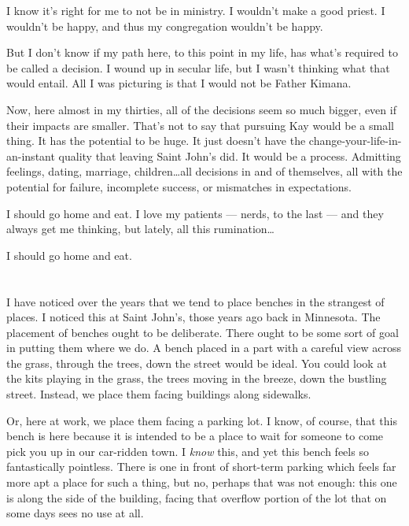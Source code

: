 I know it's right for me to not be in ministry. I wouldn't make a good priest. I wouldn't be happy, and thus my congregation wouldn't be happy.

But I don't know if my path here, to this point in my life, has what's required to be called a decision. I wound up in secular life, but I wasn't thinking what that would entail. All I was picturing is that I would not be Father Kimana.

Now, here almost in my thirties, all of the decisions seem so much bigger, even if their impacts are smaller. That's not to say that pursuing Kay would be a small thing. It has the potential to be huge. It just doesn't have the change-your-life-in-an-instant quality that leaving Saint John's did. It would be a process. Admitting feelings, dating, marriage, children\ldots all decisions in and of themselves, all with the potential for failure, incomplete success, or mismatches in expectations.

I should go home and eat. I love my patients --- nerds, to the last --- and they always get me thinking, but lately, all this rumination\ldots{}

I should go home and eat.

\section{}

I have noticed over the years that we tend to place benches in the strangest of places. I noticed this at Saint John's, those years ago back in Minnesota. The placement of benches ought to be deliberate. There ought to be some sort of goal in putting them where we do. A bench placed in a part with a careful view across the grass, through the trees, down the street would be ideal. You could look at the kits playing in the grass, the trees moving in the breeze, down the bustling street. Instead, we place them facing buildings along sidewalks.

Or, here at work, we place them facing a parking lot. I know, of course, that this bench is here because it is intended to be a place to wait for someone to come pick you up in our car-ridden town. I \emph{know} this, and yet this bench feels so fantastically pointless. There is one in front of short-term parking which feels far more apt a place for such a thing, but no, perhaps that was not enough: this one is along the side of the building, facing that overflow portion of the lot that on some days sees no use at all.

